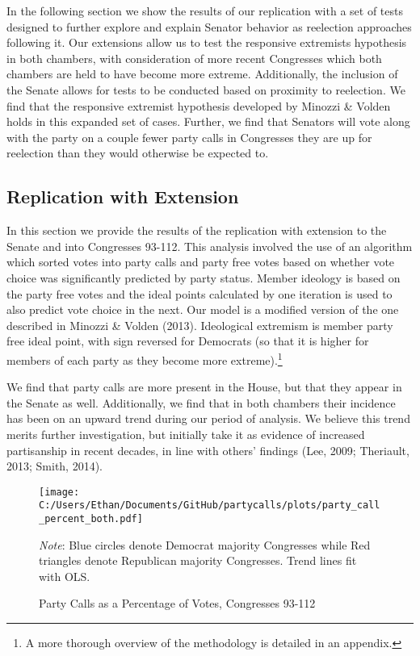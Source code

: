 \documentclass[12pt]{article}
\newcommand\fnote[1]{\captionsetup{font=small}\caption*{#1}}
\begin{document}
In the following section we show the results of our replication with a set of tests designed to further explore and explain Senator behavior as reelection approaches following it. Our extensions allow us to test the responsive extremists hypothesis in both chambers, with consideration of more recent Congresses which both chambers are held to have become more extreme. Additionally, the inclusion of the Senate allows for tests to be conducted based on proximity to reelection. We find that the responsive extremist hypothesis developed by Minozzi \& Volden holds in this expanded set of cases. Further, we find that Senators will vote along with the party on a couple fewer party calls in Congresses they are up for reelection than they would otherwise be expected to.

\subsection{Replication with Extension}

In this section we provide the results of the replication with extension to the Senate and into Congresses 93-112. This analysis involved the use of an algorithm which sorted votes into party calls and party free votes based on whether vote choice was significantly predicted by party status. Member ideology is based on the party free votes and the ideal points calculated by one iteration is used to also predict vote choice in the next. Our model is a modified version of the one described in Minozzi \& Volden (2013). Ideological extremism is member party free ideal point, with sign reversed for Democrats (so that it is higher for members of each party as they become more extreme).\footnote{A more thorough overview of the methodology is detailed in an appendix.}

We find that party calls are more present in the House, but that they appear in the Senate as well. Additionally, we find that in both chambers their incidence has been on an upward trend during our period of analysis. We believe this trend merits further investigation, but initially take it as evidence of increased partisanship in recent decades, in line with others' findings (Lee, 2009; Theriault, 2013; Smith, 2014).


\begin{figure}[H]
	\centering
	\caption{Party Calls as a Percentage of Votes, Congresses 93-112}
	\texttt{[image: C:/Users/Ethan/Documents/GitHub/partycalls/plots/party\_call\_percent\_both.pdf]}
	\fnote{\textit{Note}: Blue circles denote Democrat majority Congresses while Red triangles denote Republican majority Congresses. Trend lines fit with OLS.}
\end{figure}
\end{document}
